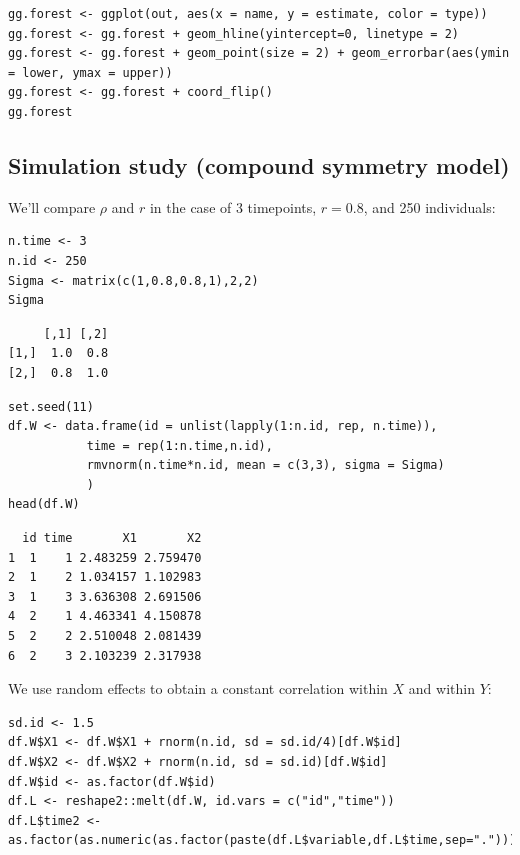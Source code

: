 \documentclass[12pt]{article}
\begin{document}
\lstset{language=r,label= ,caption= ,captionpos=b,numbers=none}
\begin{lstlisting}
gg.forest <- ggplot(out, aes(x = name, y = estimate, color = type))
gg.forest <- gg.forest + geom_hline(yintercept=0, linetype = 2)
gg.forest <- gg.forest + geom_point(size = 2) + geom_errorbar(aes(ymin = lower, ymax = upper))
gg.forest <- gg.forest + coord_flip() 
gg.forest
\end{lstlisting}

\subsection{Simulation study (compound symmetry model)}
\label{sec:org8a20edd}

We'll compare \(\rho\) and \(r\) in the case of 3 timepoints,
\(r=0.8\), and 250 individuals:
\lstset{language=r,label= ,caption= ,captionpos=b,numbers=none}
\begin{lstlisting}
n.time <- 3
n.id <- 250
Sigma <- matrix(c(1,0.8,0.8,1),2,2)
Sigma
\end{lstlisting}

\begin{verbatim}
     [,1] [,2]
[1,]  1.0  0.8
[2,]  0.8  1.0
\end{verbatim}


\lstset{language=r,label= ,caption= ,captionpos=b,numbers=none}
\begin{lstlisting}
set.seed(11)
df.W <- data.frame(id = unlist(lapply(1:n.id, rep, n.time)),
		   time = rep(1:n.time,n.id),
		   rmvnorm(n.time*n.id, mean = c(3,3), sigma = Sigma)
		   )
head(df.W)
\end{lstlisting}

\begin{verbatim}
  id time       X1       X2
1  1    1 2.483259 2.759470
2  1    2 1.034157 1.102983
3  1    3 3.636308 2.691506
4  2    1 4.463341 4.150878
5  2    2 2.510048 2.081439
6  2    3 2.103239 2.317938
\end{verbatim}


\clearpage

We use random effects to obtain a constant correlation within \(X\)
and within \(Y\):
\lstset{language=r,label= ,caption= ,captionpos=b,numbers=none}
\begin{lstlisting}
sd.id <- 1.5
df.W$X1 <- df.W$X1 + rnorm(n.id, sd = sd.id/4)[df.W$id]
df.W$X2 <- df.W$X2 + rnorm(n.id, sd = sd.id)[df.W$id]
df.W$id <- as.factor(df.W$id)
df.L <- reshape2::melt(df.W, id.vars = c("id","time")) 
df.L$time2 <- as.factor(as.numeric(as.factor(paste(df.L$variable,df.L$time,sep="."))))
\end{lstlisting}
\end{document}
